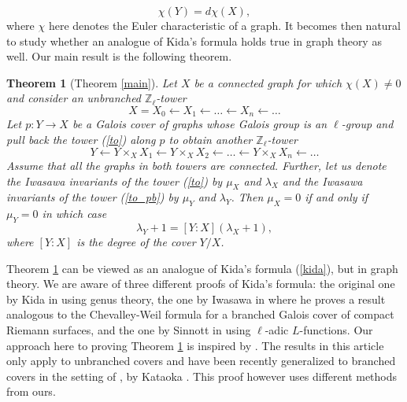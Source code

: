 \documentclass[11pt]{amsart}
\numberwithin{equation}{section}
\newtheorem{lthm}{Theorem} %
\theoremstyle{remark}
\begin{document}
\begin{equation} \label{RH_graph}
\chi(Y) = d \chi(X),
\end{equation}
where $\chi$ here denotes the Euler characteristic of a graph.  It becomes then natural to study whether an analogue of Kida's formula holds true in graph theory as well.  Our main result is the following theorem.
\begin{lthm}[{Theorem \ref{main}}]\label{thmA}
Let $X$ be a connected graph for which $\chi(X) \neq 0$ and consider an unbranched $\mathbb{Z}_{\ell}$-tower
\begin{equation} \label{to}
X = X_{0} \leftarrow X_{1} \leftarrow \ldots \leftarrow X_{n} \leftarrow \ldots
\end{equation}
Let $p:Y \rightarrow X$ be a Galois cover of graphs whose Galois group is an $\ell$-group and pull back the tower (\ref{to}) along $p$ to obtain another $\mathbb{Z}_{\ell}$-tower 
\begin{equation} \label{to_pb}
Y \leftarrow Y \times_{X}X_{1} \leftarrow Y \times_{X}X_{2} \leftarrow \ldots \leftarrow Y \times_{X}X_{n} \leftarrow \ldots 
\end{equation}
Assume that all the graphs in both towers are connected.  Further, let us denote the Iwasawa invariants of the tower (\ref{to}) by $\mu_{X}$ and $\lambda_{X}$ and the Iwasawa invariants of the tower (\ref{to_pb}) by $\mu_{Y}$ and $\lambda_{Y}$.  Then $\mu_{X} = 0$ if and only if $\mu_{Y} = 0$ in which case
\begin{equation} \label{kida_gr}
\lambda_{Y}+1 = [Y:X] (\lambda_{X} +1), 
\end{equation}
where $[Y:X]$ is the degree of the cover $Y/X$.
\end{lthm}
Theorem \ref{thmA} can be viewed as an analogue of Kida's formula (\ref{kida}), but in graph theory.  We are aware of three different proofs of Kida's formula:  the original one by Kida in \cite{Kida:1980} using genus theory, the one by Iwasawa in \cite{Iwasawa:1981} where he proves a result analogous to the Chevalley-Weil formula for a branched Galois cover of compact Riemann surfaces, and the one by Sinnott in \cite{Sinnott:1984} using $\ell$-adic $L$-functions.  Our approach here to proving Theorem \ref{thmA} is inspired by \cite{Sinnott:1984}. The results in this article only apply to unbranched covers and have been recently generalized to branched covers in the setting of \cite{GambheeraVallieres}, by Kataoka \cite{Kataokaramifiedkida}. This proof however uses different methods from ours.
\end{document}
